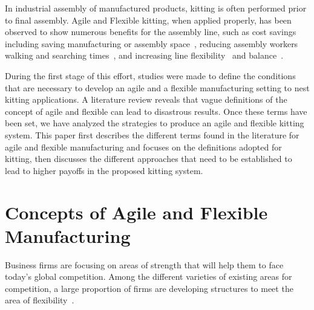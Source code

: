 \documentclass[final,3p,12pt]{elsarticle}
\begin{document}
In industrial assembly of manufactured products, kitting is often performed prior to final assembly. Agile and Flexible kitting, when applied properly, has been observed to show numerous benefits for the assembly line, such as cost savings~\cite{Carlsson_2008} including saving manufacturing or assembly space~\cite{Medbo2003}, reducing assembly workers walking and searching times~\cite{Schwind1992}, and increasing line flexibility~\cite{Bozer1992} and balance~\cite{Jiao2000}.
%

During the first stage of this effort, studies were made to define the conditions that are necessary to develop an agile and a flexible manufacturing setting to nest kitting applications. A literature review reveals that vague definitions of the concept of agile and flexible can lead to disastrous results. Once these terms have been set, we have analyzed the strategies to produce an agile and flexible kitting system. This paper first describes the different terms found in the literature for agile and flexible manufacturing and focuses on the definitions adopted for kitting, then discusses the different approaches that need to be established to lead to higher payoffs in the proposed kitting system.


\section{Concepts of Agile and Flexible Manufacturing}
\label{Sect:AgilityFlexibility}

Business firms are focusing on areas of strength that will help them to face today's global competition. Among the different varieties of existing areas for competition, a large proportion of firms are developing structures to meet the area of flexibility~\cite{Jaikumar.HBR.1986,Dertouzos.MIT.1990}.
\end{document}
